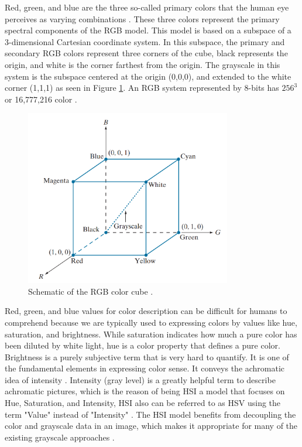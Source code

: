 \documentclass[12pt]{diazessay}
\begin{document}
    Red, green, and blue are the three so-called primary colors that the human eye perceives as varying combinations \cite{Gonzalez2001-hg}. These three colors represent the primary spectral components of the RGB model. This model is based on a subspace of a 3-dimensional Cartesian coordinate system. In this subspace, the primary and secondary RGB colors represent three corners of the cube, black represents the origin, and white is the corner farthest from the origin. The grayscale in this system is the subspace centered at the origin (0,0,0), and extended to the white corner (1,1,1) \cite{Gonzalez2001-hg} as seen in Figure \ref{fig:RGB-model}. An RGB system represented by 8-bits has $256^3$ or 16,777,216 color \cite{acharya2005image}.
    \begin{figure}[H]
        \centering
        \includegraphics[width=9cm]{Figures/RGB-model.png}
        \caption[Schematic of the RGB color cube]{Schematic of the RGB color cube \cite{Gonzalez2001-hg}.}
        \label{fig:RGB-model}
    \end{figure} 
    
    
    Red, green, and blue values for color description can be difficult for humans to comprehend because we are typically used to expressing colors by values like hue, saturation, and brightness. While saturation indicates how much a pure color has been diluted by white light, hue is a color property that defines a pure color. Brightness is a purely subjective term that is very hard to quantify. It is one of the fundamental elements in expressing color sense. It conveys the achromatic idea of intensity \cite{Gonzalez2001-hg}.  Intensity (gray level) is a greatly helpful term to describe achromatic pictures, which is the reason of being HSI a model that focuses on Hue, Saturation, and Intensity, HSI also can be referred to as HSV using the term "Value" instead of "Intensity" \cite{Stockman2001-vr}. The HSI model benefits from decoupling the color and grayscale data in an image, which makes it appropriate for many of the existing grayscale approaches \cite{Gonzalez2001-hg}.
    
\end{document}
